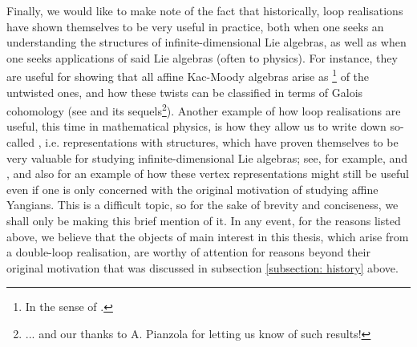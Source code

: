         Finally, we would like to make note of the fact that historically, loop realisations have shown themselves to be very useful in practice, both when one seeks an understanding the structures of infinite-dimensional Lie algebras, as well as when one seeks applications of said Lie algebras (often to physics). For instance, they are useful for showing that all affine Kac-Moody algebras arise as \footnote{In the sense of \cite[Chapter 8]{kac_infinite_dimensional_lie_algebras}.} of the untwisted ones, and how these twists can be classified in terms of Galois cohomology (see \cite{pianzola_vanishing_of_H1_of_dedekind_rings} and its sequels\footnote{... and our thanks to A. Pianzola for letting us know of such results!}). Another example of how loop realisations are useful, this time in mathematical physics, is how they allow us to write down so-called , i.e. representations with  structures, which have proven themselves to be very valuable for studying infinite-dimensional Lie algebras; see, for example, \cite[Chapter 14]{kac_infinite_dimensional_lie_algebras} and \cite{berman_billig_szmigielski_VOAs_and_toroidal_lie_algebras}, and also \cite{guay_regelskis_wendlandt_affine_yangian_vertex_representations_and_PBW} for an example of how these vertex representations might still be useful even if one is only concerned with the original motivation of studying affine Yangians. This is a difficult topic, so for the sake of brevity and conciseness, we shall only be making this brief mention of it. In any event, for the reasons listed above, we believe that the objects of main interest in this thesis, which arise from a double-loop realisation, are worthy of attention for reasons beyond their original motivation that was discussed in subsection \ref{subsection: history} above.